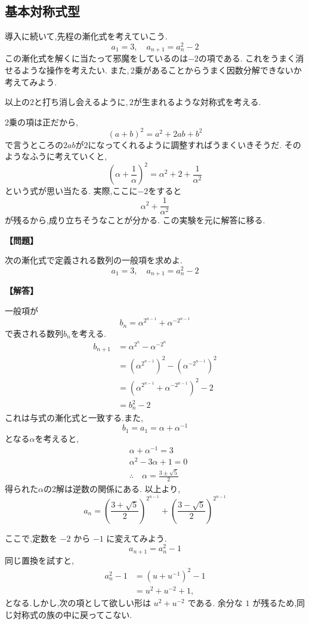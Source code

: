 \subsection{基本対称式型}
導入に続いて,先程の漸化式を考えていこう.
\[
  a_1=3, \quad a_{n+1}=a_n^2-2
\]
この漸化式を解くに当たって邪魔をしているのは$-2$の項である.
これをうまく消せるような操作を考えたい.
また,\,2乗があることからうまく因数分解できないか考えてみよう.

以上の$2$と打ち消し会えるように,\,$2$が生まれるような対称式を考える.

2乗の項は正だから,
\[
  (a+b)^2=a^2+2ab+b^2
\]
で言うところの$2ab$が$2$になってくれるように調整すればうまくいきそうだ.
そのようなふうに考えていくと,
\[
  \left(\alpha+\frac{1}{\alpha}\right)^2=\alpha^2+2+\frac{1}{\alpha^2}
\]
という式が思い当たる.
実際,ここに$-2$をすると
\[
  \alpha^2+\frac{1}{\alpha^2}
\]
が残るから,成り立ちそうなことが分かる.
この実験を元に解答に移る.

\noindent \textbf{【問題】}
\begin{smallquote}
  次の漸化式で定義される数列の一般項を求めよ.
  \[
    a_1=3, \quad a_{n+1}=a_n^2-2
  \]
\end{smallquote}
\textbf{【解答】}
  \begin{smallquote}
  一般項が
    \[
      b_n=\alpha^{2^{n-1}}+\alpha^{-2^{n-1}}
    \]
    で表される数列$b_n$を考える.
    \begin{align*}
      b_{n+1}&=\alpha^{2^{n}}-\alpha^{-2^{n}}\\
      &=\left(\alpha^{2^{n-1}}\right)^2-\left(\alpha^{-2^{n-1}}\right)^2\\
      &=\left(\alpha^{2^{n-1}}+\alpha^{-2^{n-1}}\right)^2-2\\
      &=b_n^2-2
    \end{align*}
    これは与式の漸化式と一致する.また,
    \[
      b_1=a_1=\alpha+\alpha^{-1}
    \]
    となる$\alpha$を考えると,
    \begin{align*}
      &\alpha+\alpha^{-1}=3\\
      &\alpha^2-3\alpha+1=0\\
      &\therefore \quad \alpha=\frac{3\pm \sqrt{5}}{2}
    \end{align*}
    得られた$\alpha$の2解は逆数の関係にある.
    以上より,
    \[
      a_n=\left(\frac{3+ \sqrt{5}}{2}\right)^{2^{n-1}}+\left(\frac{3- \sqrt{5}}{2}\right)^{2^{n-1}}
    \]
  \end{smallquote}

ここで,定数を $-2$ から $-1$ に変えてみよう.
\[
  a_{n+1}=a_n^2-1
\]
同じ置換を試すと,
\begin{align*}
  a_n^2-1
    &=\left(u+u^{-1}\right)^2-1\\
    &=u^2+u^{-2}+1,
\end{align*}
となる.しかし,次の項として欲しい形は $u^2+u^{-2}$ である.
余分な $1$ が残るため,同じ対称式の族の中に戻ってこない.

